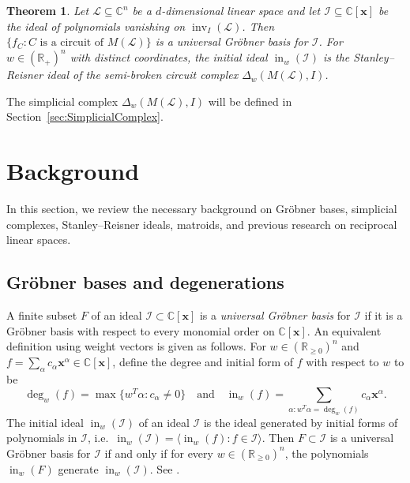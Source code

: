 \documentclass[10pt]{amsart}
\newtheorem{theo}{Theorem}[section]
\theoremstyle{definition}
\providecommand{\ie}{i.e.\ }
\newcommand{\R}{\mathbb{R}}
\newcommand{\Cbb}{\mathbb{C}}
\newcommand{\I}{\mathcal{I}}
\newcommand{\cL}{\mathcal{L}}
\newcommand{\x}{\mathbf{x}}
\DeclareMathOperator{\In}{in}
\DeclareMathOperator{\inv}{inv}
\begin{document}
\begin{theo}\label{thm:main}
Let $\cL\subseteq \Cbb^n$ be a $d$-dimensional linear space and 
let $\I \subseteq \Cbb[\x]$ be the ideal of polynomials vanishing on $\inv_I(\cL)$. 
Then $\{f_C : C \text{ is a circuit of }M(\cL)\}$ is a universal Gr\"obner basis for $\I$. 
For $w\in (\R_+)^n$ with distinct coordinates, the initial ideal $\In_w(\I)$ is the Stanley--Reisner 
ideal of the semi-broken circuit complex $\Delta_w(M(\cL), I)$. 
\end{theo}
The simplicial complex $\Delta_w(M(\cL), I)$ will be defined in Section~\ref{sec:SimplicialComplex}.
\section{Background}\label{Background}

In this section, we review the necessary background on Gr\"obner bases, simplicial complexes, Stanley--Reisner ideals, matroids, and 
previous research on reciprocal linear spaces. 

\subsection{Gr\"obner bases and degenerations} \label{subsec:Grobner}

A finite subset $F$ of an ideal $\I \subset \Cbb[\x]$ is a \emph{universal Gr\"obner basis} for $\I$ 
if it is a Gr\"obner basis with respect to every monomial order on $\Cbb[\x]$. 
An equivalent definition using weight vectors is given as follows. For $w\in (\R_{\geq 0})^n$ and $f = \sum_\alpha c_{\alpha} \x^{\alpha} \in \Cbb[\x]$, 
define the degree and initial form of $f$ with respect to $w$ to be 
\[
\deg_w(f) = \max\{w^T\alpha : c_{\alpha}\neq 0\} \quad \text{and} \quad
\In_w(f) = \sum_{\alpha: w^T\alpha = \deg_w(f) } c_{\alpha} \x^{\alpha}. \]
The initial ideal $\In_w(\I)$ of an ideal $\I$ is the ideal generated by initial forms of polynomials in $\I$, \ie $\In_w(\I) = \langle \In_w(f) : f\in \I\rangle$. 
Then $F\subset \I$ is a universal Gr\"obner basis for $\I$ if and only if for every $w\in (\R_{\geq 0})^n$, the polynomials $\In_w(F)$ generate $\In_w(\I)$. 
See \cite[Chapter~1]{GrobnerPolytope}. 
\end{document}
